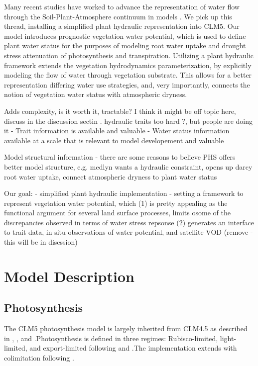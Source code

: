 \documentclass[draft,linenumbers]{agujournal}
\begin{document}
Many recent studies have worked to advance the representation of water flow through the Soil-Plant-Atmosphere continuum in models \citep{xu2016,christoffersen2016,sperry2017}.
We pick up this thread, installing a simplified plant hydraulic representation into CLM5.
Our model introduces prognostic vegetation water potential, which is used to define plant water status for the purposes of modeling root water uptake and drought stress attenuation of photosynthesis and transpiration.
Utilizing a plant hydraulic framework extends the vegetation hydrodynamics parameterization, by explicitly modeling the flow of water through vegetation substrate.
This allows for a better representation differing water use strategies, and, very importantly, connects the notion of vegetation water status with atmospheric dryness.

Adds complexity, is it worth it, tractable? I think it might be off topic here, discuss in the discussion sectin
       . hydraulic traits too hard \citep{drake2017}?, but people are doing it \citep{xu2016,christoffersen2016}
  - Trait information is available \citep{kattge2011,anderegg2015a} and valuable \citep{choat2012}
  - Water status information available at a scale that is relevant to model developement \citep{konings2016,grant2016} and valuable \citep{momen2017,konings2017b}

Model structural information
  - there are some reasons to believe PHS offers better model structure,
  e.g. medlyn wants a hydraulic constraint, opens up darcy root water uptake, connect atmospheric dryness to plant water status
  
Our goal:
  - simplified plant hydraulic implementation
  - setting a framework to represent vegetation water potential, which
  (1) is pretty appealing as the functional argument for several land surface processes, limits osome of the discrepancies observed in terms of water stress repsonse
  (2) generates an interface to trait data, in situ observations of water potential, and satellite VOD \citep{momen2017} (remove - this will be in discssion)


\section{Model Description}

\subsection{Photosynthesis}
\label{sect:A}
    The CLM5 photosynthesis model is largely inherited from CLM4.5 as described in \citet{bonan2011}, \citet{thornton2007},
    and \citet{oleson2013}.Photosynthesis is defined in three regimes: Rubisco-limited, light-limited, and export-limited 
    following \citet{farquhar1980} and \citet{harley1992}.The implementation extends \citet{sellers1996a,sellers1996b} with 
    colimitation following \citet{collatz1991}. 
    
\end{document}
